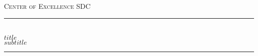 %
%
%
% 


	\newcommand{\HRule}{\rule{\linewidth}{0.5mm}} %
	
	\center %
	
	
	\textsc{\LARGE Center of Excellence SDC}\\[1.5cm] %
	
	
	
	
	\HRule\\[0.4cm]
	
	{\huge\bfseries{} $title$}\\[0.4cm] %
	{\large\bfseries{} $subtitle$}\\[0.4cm]

	\HRule\\[1.5cm]
	
	
